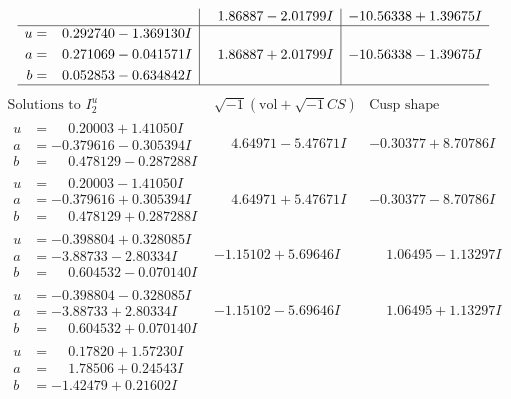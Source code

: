 \documentclass[1p]{elsarticle_modified}
\theoremstyle{definition}
\newcommand{\I}{\sqrt{-1}}
\begin{document}
$$\begin{array}{c|c|c}
 & \phantom{-}1.86887 - 2.01799 I & -10.56338 + 1.39675 I \\ \hline\begin{aligned}
u &= \phantom{-}0.292740 - 1.369130 I \\
a &= \phantom{-}0.271069 - 0.041571 I \\
b &= \phantom{-}0.052853 - 0.634842 I\end{aligned}
 & \phantom{-}1.86887 + 2.01799 I & -10.56338 - 1.39675 I\\
 \hline 
 \end{array}$$\newpage$$\begin{array}{c|c|c}  
\text{Solutions to }I^u_{2}& \I (\text{vol} + \sqrt{-1}CS) & \text{Cusp shape}\\
 \hline 
\begin{aligned}
u &= \phantom{-}0.20003 + 1.41050 I \\
a &= -0.379616 - 0.305394 I \\
b &= \phantom{-}0.478129 - 0.287288 I\end{aligned}
 & \phantom{-}4.64971 - 5.47671 I & -0.30377 + 8.70786 I \\ \hline\begin{aligned}
u &= \phantom{-}0.20003 - 1.41050 I \\
a &= -0.379616 + 0.305394 I \\
b &= \phantom{-}0.478129 + 0.287288 I\end{aligned}
 & \phantom{-}4.64971 + 5.47671 I & -0.30377 - 8.70786 I \\ \hline\begin{aligned}
u &= -0.398804 + 0.328085 I \\
a &= -3.88733 - 2.80334 I \\
b &= \phantom{-}0.604532 - 0.070140 I\end{aligned}
 & -1.15102 + 5.69646 I & \phantom{-}1.06495 - 1.13297 I \\ \hline\begin{aligned}
u &= -0.398804 - 0.328085 I \\
a &= -3.88733 + 2.80334 I \\
b &= \phantom{-}0.604532 + 0.070140 I\end{aligned}
 & -1.15102 - 5.69646 I & \phantom{-}1.06495 + 1.13297 I \\ \hline\begin{aligned}
u &= \phantom{-}0.17820 + 1.57230 I \\
a &= \phantom{-}1.78506 + 0.24543 I \\
b &= -1.42479 + 0.21602 I\end{aligned}

\end{array}$$
\end{document}
